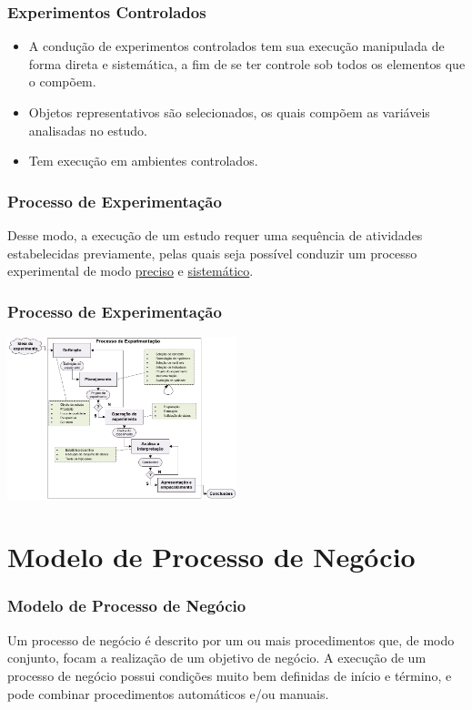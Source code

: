\documentclass[aspectratio=169]{beamer}
\begin{document}
\begin{frame}
\frametitle{Experimentos Controlados}
\justifying


\begin{itemize}
\item A condução de experimentos controlados tem sua execução manipulada de forma direta e sistemática, a fim de se ter controle sob todos os elementos que o compõem. 
\item Objetos representativos são selecionados, os quais compõem as variáveis analisadas no estudo. 
\item Tem execução em ambientes controlados.
\end{itemize}

\end{frame}

\begin{frame}
\frametitle{Processo de Experimentação}
\justifying

Desse modo, a execução de um estudo requer uma sequência de atividades estabelecidas previamente, pelas quais seja possível conduzir um processo experimental de modo \underline{preciso} e \underline{sistemático}.


\end{frame}

\begin{frame}
\frametitle{Processo de Experimentação}
\justifying

\begin{center}
\includegraphics[width=0.5\textwidth]{experimento.png}
\end{center}


\end{frame}




\section{Modelo de Processo de Negócio}

\begin{frame}
\frametitle{Modelo de Processo de Negócio}
\justifying

Um processo de negócio é descrito por um ou mais procedimentos que, de modo conjunto, focam a realização de um objetivo de negócio. A execução de um processo de negócio possui condições muito bem definidas de início e término, e pode combinar procedimentos automáticos e/ou manuais.


\end{frame}
\end{document}
